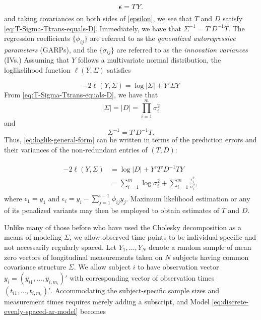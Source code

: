 \documentclass[12pt]{article}
\newcommand{\bfeps}{\mbox{\boldmath $\epsilon$}}
\theoremstyle{definition}
\begin{document}
{{{{\begin{equation}
\bfeps = T Y \label{eq:vectorized-ar-model}.
\end{equation}
\noindent
and taking covariances on both sides of \eqref{epsilon}, we see that $T$ and $D$ satisfy \ref{eq:T-Sigma-Ttrans-equals-D}. Immediately, we have that $\Sigma^{-1} = T' D^{-1} T$. The regression coefficients $\lbrace \phi_{ij} \rbrace$ are referred to as the \emph{generalized autoregressive parameters} (GARPs), and the $\lbrace \sigma_{ij} \rbrace$ are referred to as the \emph{innovation variances} (IVs.) 
\bigskip
Assuming that $Y$ follows a multivariate normal distribution, the loglikelihood function $\ell \left( Y, \Sigma \right)$ satisfies

\begin{equation} \label{eq:loglik-general-form}
-2\ell\left( Y, \Sigma \right) = \log \vert \Sigma \vert + Y' \Sigma Y
\end{equation}
\noindent
From \ref{eq:T-Sigma-Ttrans-equals-D}, we have that 
\[
\vert \Sigma\vert = \vert D \vert = \prod_{i = 1}^m \sigma_i^2
\]
and 
\[
\Sigma^{-1} = T' D^{-1} T.
\]
Thus, \ref{eq:loglik-general-form} can be written in terms of the prediction errors and their variances of the non-redundant entries of $\left(T , D\right)$:

\begin{align}
\begin{split} \label{eq:loglik-cholesky-form}
-2\ell\left( Y, \Sigma \right) &= \log \vert D \vert + Y' T' D^{-1} T Y \\
&= \sum_{i = 1}^m \log \sigma_i^2  + \sum_{i = 1}^m \frac {\epsilon_i^2}{\sigma_i^2},
\end{split}
\end{align}
\noindent
where $\epsilon_1 = y_1$ and $\epsilon_i = y_i - \sum_{j = 1}^{i-1} \phi_{ij} y_j$. Maximum likelihood estimation or any of its penalized variants may then be employed to obtain estimates of $T$ and $D$.

\bigskip
Unlike many of those before who have used the Cholesky decomposition as a means of modeling $\Sigma$, we allow observed time points to be individual-specific and not necessarily regularly spaced.  Let $Y_1, \dots, Y_N$ denote a random sample of mean zero vectors of longitudinal measurements taken on $N$ subjects having common covariance structure $\Sigma$.  We allow subject $i$ to have observation vector $y_i = \left(y_{i1} ,\dots , y_{i,m_i}\right)'$ with corresponding vector of observation times $\left(t_{i1} ,\dots , t_{i,m_i}\right)'$.  Accommodating the subject-specific sample sizes and measurement times requires merely adding a subscript, and Model \ref{eq:discrete-evenly-spaced-ar-model} becomes 

}}}}
\end{document}
